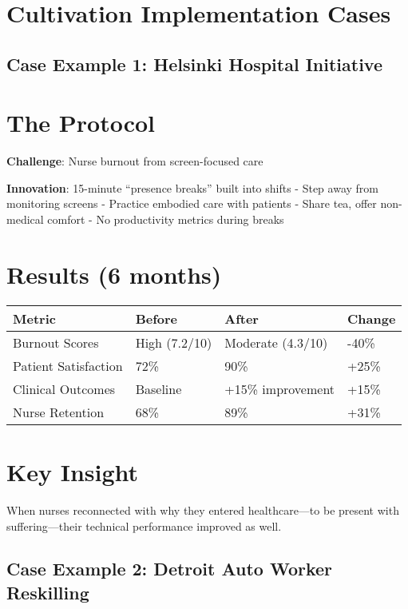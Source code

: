 \documentclass[
  a4paper,
]{report}
\begin{document}
\section{Cultivation Implementation
Cases}\label{cultivation-implementation-cases}

\subsection{Case Example 1: Helsinki Hospital
Initiative}\label{case-example-1-helsinki-hospital-initiative}

\section{The Protocol}

\textbf{Challenge}: Nurse burnout from screen-focused care

\textbf{Innovation}: 15-minute ``presence breaks'' built into shifts -
Step away from monitoring screens - Practice embodied care with patients
- Share tea, offer non-medical comfort - No productivity metrics during
breaks

\section{Results (6 months)}

\begin{longtable}[]{@{}llll@{}}
\toprule\noalign{}
Metric & Before & After & Change \\
\midrule\noalign{}
\endhead
\bottomrule\noalign{}
\endlastfoot
Burnout Scores & High (7.2/10) & Moderate (4.3/10) & -40\% \\
Patient Satisfaction & 72\% & 90\% & +25\% \\
Clinical Outcomes & Baseline & +15\% improvement & +15\% \\
Nurse Retention & 68\% & 89\% & +31\% \\
\end{longtable}

\section{Key Insight}

When nurses reconnected with why they entered healthcare---to be present
with suffering---their technical performance improved as well.

\subsection{Case Example 2: Detroit Auto Worker
Reskilling}\label{case-example-2-detroit-auto-worker-reskilling}
\end{document}
